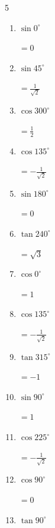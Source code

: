\begin{multicols}{5}
\begin{enumerate}
        $\displaystyle =\frac{1}{2}$

  \item $\displaystyle \sin{0^\circ}$

        $\displaystyle =0$

  \item $\displaystyle \sin{45^\circ}$

        $\displaystyle =\frac{1}{\sqrt{2}}$

  \item $\displaystyle \cos{300^\circ}$

        $\displaystyle =\frac{1}{2}$

  \item $\displaystyle \cos{135^\circ}$

        $\displaystyle =-\frac{1}{\sqrt{2}}$

  \item $\displaystyle \sin{180^\circ}$

        $\displaystyle =0$

  \item $\displaystyle \tan{240^\circ}$

        $\displaystyle =\sqrt{3}$

\columnbreak %

  \item $\displaystyle \cos{0^\circ}$

        $\displaystyle =1$

  \item $\displaystyle \cos{135^\circ}$

        $\displaystyle =-\frac{1}{\sqrt{2}}$

  \item $\displaystyle \tan{315^\circ}$

        $\displaystyle =-1$

  \item $\displaystyle \sin{90^\circ}$

        $\displaystyle =1$

  \item $\displaystyle \cos{225^\circ}$

        $\displaystyle =-\frac{1}{\sqrt{2}}$

  \item $\displaystyle \cos{90^\circ}$

        $\displaystyle =0$

  \item $\displaystyle \tan{90^\circ}$


\end{enumerate}
\end{multicols}
